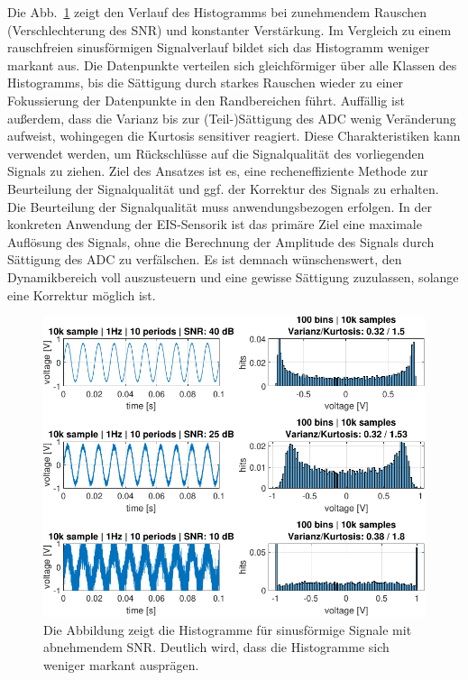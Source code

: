 Die Abb.~\ref{fig:Histogramm-SNR} zeigt den Verlauf des Histogramms bei zunehmendem Rauschen (Verschlechterung des SNR) und konstanter Verstärkung. Im Vergleich zu einem rauschfreien sinusförmigen Signalverlauf bildet sich das Histogramm weniger markant aus. Die Datenpunkte verteilen sich gleichförmiger über alle Klassen des Histogramms, bis die Sättigung durch starkes Rauschen wieder zu einer Fokussierung der Datenpunkte in den Randbereichen führt. Auffällig ist außerdem, dass die Varianz bis zur (Teil-)Sättigung des ADC wenig Veränderung aufweist, wohingegen die Kurtosis sensitiver reagiert. Diese Charakteristiken kann verwendet werden, um Rückschlüsse auf die Signalqualität des vorliegenden Signals zu ziehen. Ziel des Ansatzes ist es, eine recheneffiziente Methode zur Beurteilung der Signalqualität und ggf. der Korrektur des Signals zu erhalten. Die Beurteilung der Signalqualität muss anwendungsbezogen erfolgen. In der konkreten Anwendung der EIS-Sensorik ist das primäre Ziel eine maximale Auflösung des Signals, ohne die Berechnung der Amplitude des Signals durch Sättigung des ADC zu verfälschen. Es ist demnach wünschenswert, den Dynamikbereich voll auszusteuern und eine gewisse Sättigung zuzulassen, solange eine Korrektur möglich ist.

\begin{figure}[h!] 
	\centering 
	\includegraphics[width=1\columnwidth]{../img/noise-histogramm.pdf}
	\caption{Die Abbildung zeigt die Histogramme für sinusförmige Signale mit abnehmendem SNR. Deutlich wird, dass die Histogramme sich weniger markant ausprägen.}
	\label{fig:Histogramm-SNR}
\end{figure} 

